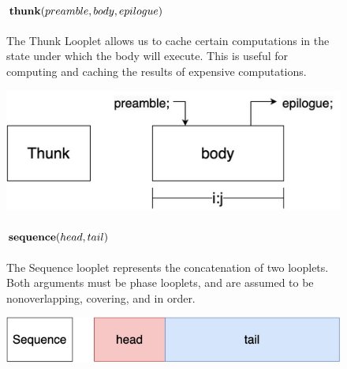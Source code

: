 \begin{figure}[ht]
\begin{minipage}[c]{0.6\linewidth}
        \paragraph{$\text{\textbf{thunk}}(preamble, body, epilogue)$} The Thunk Looplet
        allows us to cache certain computations in the state under which the
        body will execute. This is useful for computing and caching the results
        of expensive computations.
    \end{minipage}%
    \begin{minipage}[c]{0.4\linewidth}
        \centering
        \includegraphics[scale=0.25]{Looplets-thunk.png}
    \end{minipage}

    \begin{minipage}[c]{0.6\linewidth}
        \paragraph{$\text{\textbf{sequence}}(head, tail)$} The Sequence looplet represents the
        concatenation of two looplets. Both arguments must be phase looplets, and
        are assumed to be nonoverlapping, covering, and in order.
    \end{minipage}%
    \begin{minipage}[c]{0.4\linewidth}
        \centering
        \includegraphics[scale=0.25]{Looplets-sequence.png}
    \end{minipage}

    \begin{minipage}[c]{0.6\linewidth}

\end{minipage}
\end{figure}
